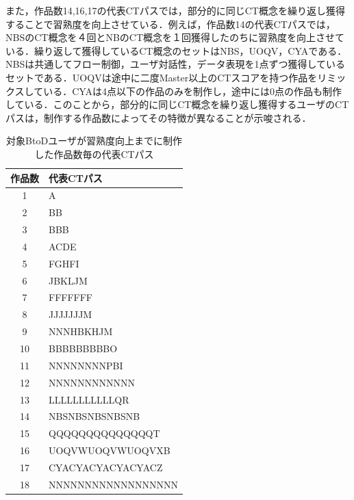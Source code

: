\documentclass[submit,ses,noauthor]{ipsj}
\begin{document}
また，作品数14,16,17の代表CTパスでは，部分的に同じCT概念を繰り返し獲得することで習熟度を向上させている．例えば，作品数14の代表CTパスでは，NBSのCT概念を４回とNBのCT概念を１回獲得したのちに習熟度を向上させている．繰り返して獲得しているCT概念のセットはNBS，UOQV，CYAである．NBSは共通してフロー制御，ユーザ対話性，データ表現を1点ずつ獲得しているセットである．UOQVは途中に二度Master以上のCTスコアを持つ作品をリミックスしている．CYAは4点以下の作品のみを制作し，途中には0点の作品も制作している．このことから，部分的に同じCT概念を繰り返し獲得するユーザのCTパスは，制作する作品数によってその特徴が異なることが示唆される．


\begin{table}[h]
  \begin{minipage}[t]{0.45\linewidth} %
    \centering
    \caption{対象BtoDユーザが習熟度向上までに制作した作品数毎の代表CTパス}
    \label{tab:split-ct-btod}
    \vspace{2mm}
  \begin{tabular}{c|l}
    \hline
    作品数 & 代表CTパス\\
    \hline
    \hline
    1 & A \\
    \hline
    2 & BB \\
    \hline
    3 & BBB \\
    \hline
    4 & ACDE \\
    \hline
    5 & FGHFI \\
    \hline
    6 & JBKLJM \\
    \hline
    7 & FFFFFFF  \\
    \hline
    8 & JJJJJJJM \\
    \hline
    9 & NNNHBKHJM \\
    \hline
    10 & BBBBBBBBBO \\
    \hline
    11 & NNNNNNNNPBI \\
    \hline
    12 & NNNNNNNNNNNN \\
    \hline
    13 & LLLLLLLLLLLQR \\
    \hline
    14 & NBSNBSNBSNBSNB \\
    \hline
    15 & QQQQQQQQQQQQQQT \\
    \hline
    16 & UOQVWUOQVWUOQVXB \\
    \hline
    17 & CYACYACYACYACYACZ \\
    \hline
    18 & NNNNNNNNNNNNNNNNNN \\
    \hline
  \end{tabular}
  \end{minipage}%
  \begin{minipage}[t]{0.55\linewidth}

\end{minipage}
\end{table}
\end{document}
